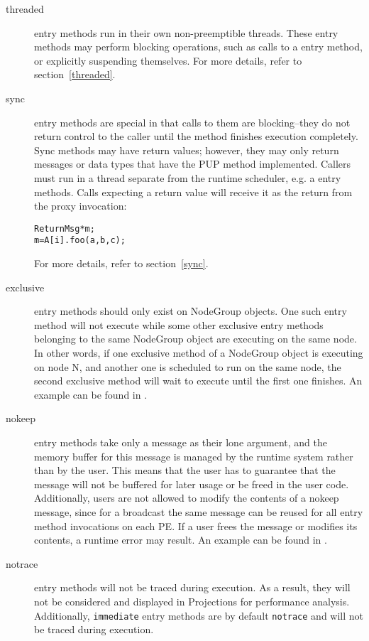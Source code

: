 \begin{description}
\item[threaded] entry methods 
run in their own non-preemptible threads. These
entry methods may perform blocking operations, such as calls to a
 entry method, or explicitly suspending themselves. For more
details, refer to section~\ref{threaded}.

\item[sync] entry methods are special in that
calls to them are blocking--they do not return control to the caller until the
method finishes execution completely. Sync methods may have return values;
however, they may only return messages or data types that have the PUP method implemented. Callers must run in a thread separate
from the runtime scheduler, e.g. a  entry methods.  Calls
expecting a return value will receive it as the return from the proxy
invocation:
\begin{alltt}
 ReturnMsg* m;
 m = A[i].foo(a, b, c);
\end{alltt}
For more details, refer to section~\ref{sync}.

\item[exclusive]  entry methods should
only exist on NodeGroup objects. One such entry method will not execute while
some other exclusive entry methods belonging to the same NodeGroup object are
executing on the same node. In other words, if one exclusive method of a
NodeGroup object is executing on node N, and another one is scheduled to run on
the same node, the second exclusive method will wait to execute until the first
one finishes. An example can be found in .

\item[nokeep] entry methods take only a message as their lone argument,
and the memory buffer for this message is managed by the \charmpp{} runtime system
rather than by the user. This means that the user has to guarantee that
the message will not be buffered for later usage or be freed in the user
code. Additionally, users are not allowed to modify the contents of a nokeep
message, since for a broadcast the same message can be reused for all entry method
invocations on each PE. If a user frees the message or modifies its contents,
a runtime error may result. An example can be found in .

\item[notrace] entry methods will not be traced during execution. As a result, they will not be considered and displayed in Projections for
  performance analysis. Additionally, \texttt{immediate} entry methods are by default \texttt{notrace} and will
not be traced during execution.


\end{description}
